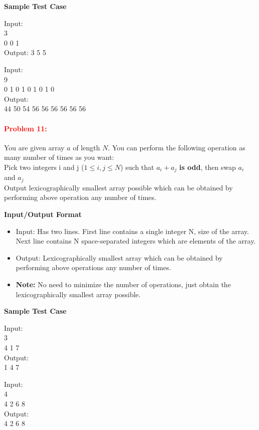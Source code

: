 \documentclass[a4paper,11pt]{article} %
\begin{document}
\textbf{Sample Test Case}

Input:\\
3\\
0 0 1\\
Output: 3 5 5
\vspace*{0.5cm}

Input: \\
9\\
0 1 0 1 0 1 0 1 0\\
Output:\\
44 50 54 56 56 56 56 56 56\\
\vspace*{0.5cm}

\newpage
\paragraph{\textcolor{red}{Problem 11:}}
You are given array $a$ of length $N$. You can perform the following operation as many number of times as you want:\\
Pick two integers i and j ($1 \leq i,j \leq N$) such that $a_i + a_j$ \textbf{is odd}, then swap $a_i$ and $a_j$\\
Output lexicographically smallest array possible which can be obtained by performing above operation any number of times.
\vspace*{0.5cm}

\textbf{Input/Output Format}
\begin{itemize}
    \item  Input: Has two lines. First line contains a single integer N, size of the array. Next line contains N space-separated integers which are elements of the array.
    \item  Output: Lexicographically smallest array which can be obtained by performing above operations any number of times.
    \item \textbf{Note: } No need to minimize the number of operations, just  obtain the lexicographically smallest array possible.
\end{itemize}

\textbf{Sample Test Case}

Input:\\ 3 \\ 4 1 7\\
Output:\\ 1 4 7
\vspace*{0.5cm}

Input:\\ 4 \\ 4 2 6 8 \\
Output:\\ 4 2 6 8
\vspace*{0.5cm}
\end{document}

